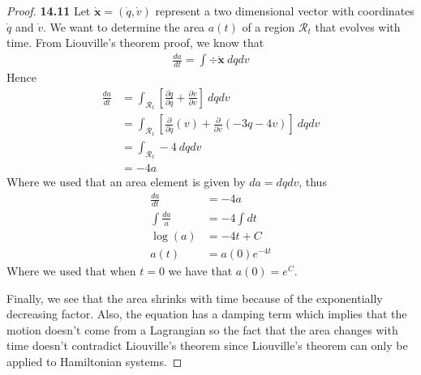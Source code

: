 \documentclass[11pt]{article}
\theoremstyle{definition}
\begin{document}
\cleardoublepage
\begin{proof}{\textbf{14.11}}
    Let $\bm{\dot{x}} = (\dot q, \dot v)$ represent a two dimensional vector
    with coordinates $\dot q$ and $\dot v$.
    We want to determine the area $a(t)$ of a region $\mathcal{R}_t$
    that evolves with time.
    From Liouville's theorem proof, we know that
    \begin{align*}
        \frac{da}{dt} = \int \div\bm{\dot{x}}~dq dv
    \end{align*}
    Hence
    \begin{align*}
        \frac{da}{dt} &= \int_{\mathcal{R}_t} \left[
            \frac{\partial \dot{q}}{\partial q} + \frac{\partial \dot{v}}{\partial v}
        \right]~dq dv\\
        &= \int_{\mathcal{R}_t} \left[
            \frac{\partial}{\partial q}(v) + \frac{\partial }{\partial v}(-3q - 4v)
        \right]~dq dv\\
        &= \int_{\mathcal{R}_t} -4 ~dq dv\\
        &= -4a
    \end{align*}
    Where we used that an area element is given by $da = dqdv$, thus
    \begin{align*}
        \frac{da}{dt} &= -4a\\
        \int \frac{da}{a} &= -4\int dt\\
        \log(a) &= -4t + C\\
        a(t) &= a(0)e^{-4t}
    \end{align*}
    Where we used that when $t=0$ we have that $a(0) = e^{C}$.
    
    Finally, we see that the area shrinks with time because of the exponentially
    decreasing factor. Also, the equation has a
    damping term which implies that the motion doesn't come from a Lagrangian
    so the fact that the area changes with time doesn't contradict Liouville's
    theorem since Liouville's theorem can only be applied to Hamiltonian
    systems.
\end{proof}
\end{document}
